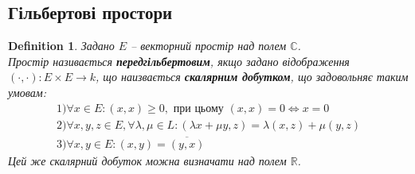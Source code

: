 \documentclass[a4paper, 10pt]{article}
\theoremstyle{theoremdd}
\newtheorem{definition}[theorem]{Definition}
\begin{document}
\subsection{Гільбертові простори}
\begin{definition}
Задано $E$ -- векторний простір над полем $\mathbb{C}$.\\
Простір називається \textbf{передгільбертовим}, якщо задано відображення $(\cdot,\cdot) \colon E \times E \to k$, що наизвається \textbf{скалярним добутком}, що задовольняє таким умовам:
\begin{align*}
1)\forall x \in E: (x,x) \geq 0, \text{ при цьому } (x,x) = 0 \iff x = 0 \\
2)\forall x,y,z \in E, \forall \lambda,\mu \in L: (\lambda x + \mu y, z) = \lambda(x,z) + \mu(y,z) \\
3) \forall x,y \in E: (x,y) = \overline{(y,x)}
\end{align*}
Цей же скалярний добуток можна визначати над полем $\mathbb{R}$.
\end{definition}
\end{document}

